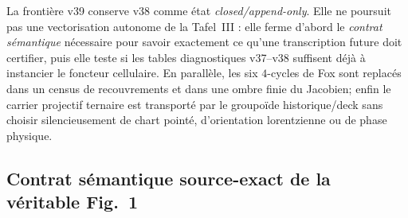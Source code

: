 \documentclass[11pt,a4paper]{article}
\begin{document}
La frontière v39 conserve v38 comme état \emph{closed/append-only}. Elle ne poursuit pas une vectorisation autonome de la Tafel~III : elle ferme d'abord le \emph{contrat sémantique} nécessaire pour savoir exactement ce qu'une transcription future doit certifier, puis elle teste si les tables diagnostiques v37--v38 suffisent déjà à instancier le foncteur cellulaire. En parallèle, les six $4$-cycles de Fox sont replacés dans un census de recouvrements et dans une ombre finie du Jacobien; enfin le carrier projectif ternaire est transporté par le groupoïde historique/deck sans choisir silencieusement de chart pointé, d'orientation lorentzienne ou de phase physique.

\subsection{Contrat sémantique source-exact de la véritable Fig.~1}
\end{document}
